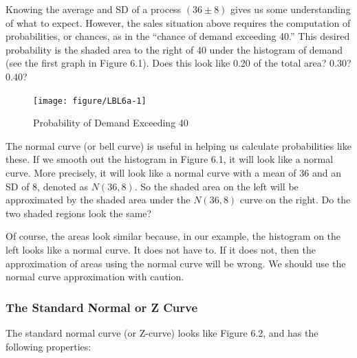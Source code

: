 \documentclass[11pt, chapterprefix=true]{scrbook}\usepackage[]{graphicx}\usepackage[]{color}
\begin{document}
Knowing the average and SD of a process $(36 \pm 8)$ gives us some understanding of what to expect.  However, the sales situation above requires the computation of probabilities, or chances, as in the ``chance of demand exceeding 40.''   This desired probability is the shaded area to the right of 40 under the histogram of demand (see the first graph in Figure 6.1).  Does this look like 0.20 of the total area?  0.30?  0.40?

\begin{figure}[ht]
\caption{Probability of Demand Exceeding 40}



{\centering \texttt{[image: figure/LBL6a-1]} 

}



\end{figure}

The normal curve (or bell curve) is useful in helping us calculate probabilities like these.  If we smooth out the histogram in Figure 6.1, it will look like a normal curve.  More precisely, it will look like a normal curve with a mean of 36 and an SD of 8, denoted as $N(36, 8)$.  So the shaded area on the left will be approximated by the shaded area under the $N(36, 8)$ curve on the right.  Do the two shaded regions look the same?

Of course, the areas look similar because, in our example, the histogram on the left looks like a normal curve.  It does not have to.  If it does not, then the approximation of areas using the normal curve will be wrong.  We should use the normal curve approximation with caution.

\subsubsection{The Standard Normal or Z Curve}

The standard normal curve (or Z-curve) looks like Figure 6.2, and has the following properties:

\begin{center}
\end{center}
\end{document}
